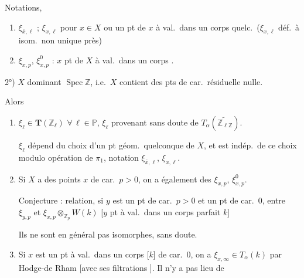 \documentclass[11pt,a4paper]{article}
\begin{document}

Notations,
\begin{enumerate}
  \item[(i)] $\xi_{\bar{x},\ell}$ \ill{} ; $\xi_{x,\ell}$ \ill{} pour
  $x \in X$ ou un pt de $x$ à val.\ dans un corps quelc.\ ($\xi_{x,\ell}$
  déf.\ à isom.\ non unique près)
  \item[(ii)] $\xi_{x,p}$, $\xi_{x,p}^{0}$ : $x$ pt de $X$ à val.\ dans un
  corps .
\end{enumerate}


2°) $X$  dominant $\operatorname{Spec} \mathbb{Z}$, i.e.\ $X$
contient des pts de car.\ résiduelle nulle.

Alors 

\begin{enumerate}
  \item[(i)] $\xi_\ell \in \mathbf{T}(\mathbb{Z}_\ell)$ $\forall\, \ell \in
  \mathbb{P}$, $\xi_\ell$ provenant sans doute de
  $T_\alpha(\widetilde{\mathbb{Z}_{\ell\mathbb{Z}}})$.

  $\xi_\ell$ dépend du choix d'un pt géom.\ quelconque de $X$, et est
  indép.\ de ce choix modulo opération de $\pi_1$, notation
  $\xi_{\bar{x},\ell}$, $\xi_{x,\ell}$.

  \item[(ii)] Si $X$ a des points $x$ de car.\ $p > 0$, on a \ill{}
  également des $\xi_{x,p}$, $\xi_{x,p}^{0}$.

  Conjecture : relation, \struck{\ill{}} si $y$ est un pt de car.\ $p > 0$
  et \struck{\ill{}} un pt de car.\ $0$, entre $\xi_{y,p}$ et
  $\xi_{x,p} \otimes_{\mathbb{Z}_p} W(k)$ [$y$ pt à val.\ dans un corps
  parfait $k$]

  Ils ne sont en général pas isomorphes, sans doute.

  \item[(iii)] Si $x$ est un pt à val.\ dans un corps [$k$] de car.\ $0$,
  on a $\xi_{x,\infty} \in T_\alpha(k)$ par Hodge-de Rham [avec ses
   filtrations \struck{\ill{}}]. Il n'y a pas lieu de
\end{enumerate}
\end{document}

